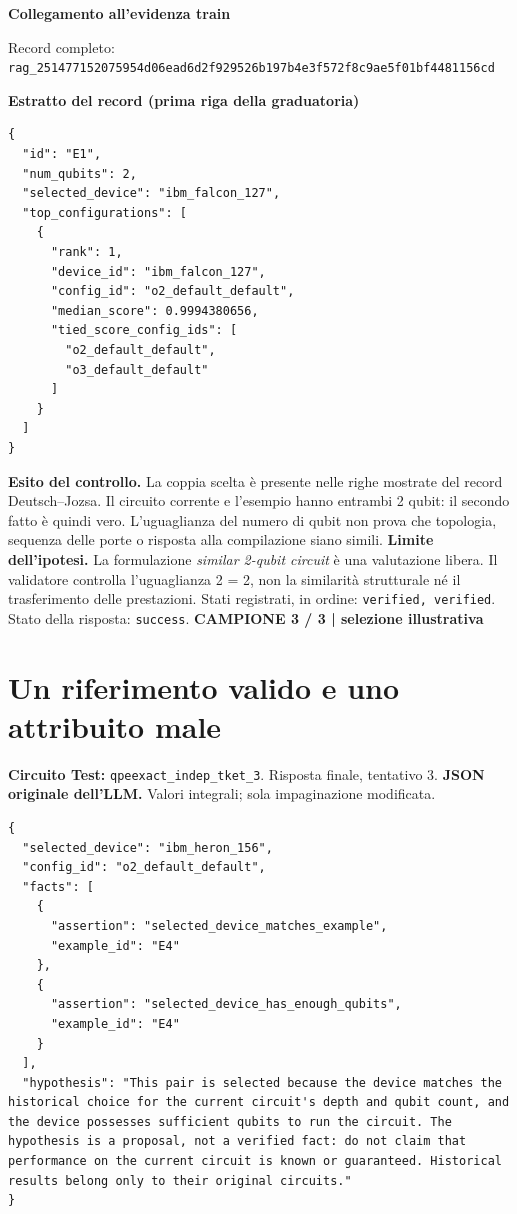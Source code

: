 \documentclass[a4paper,10pt]{article}
\newcommand{\tagline}[1]{{\small\color{ink}\textbf{#1}}\par}
\begin{document}
\textbf{Collegamento all'evidenza train}
\begin{center}\end{center}
{\footnotesize Record completo: \texttt{rag\_251477152075954d06ead6d2f929526b197b4e3f572f8c9ae5f01bf4481156cd}}\par
\textbf{Estratto del record (prima riga della graduatoria)}
\begin{lstlisting}
{
  "id": "E1",
  "num_qubits": 2,
  "selected_device": "ibm_falcon_127",
  "top_configurations": [
    {
      "rank": 1,
      "device_id": "ibm_falcon_127",
      "config_id": "o2_default_default",
      "median_score": 0.9994380656,
      "tied_score_config_ids": [
        "o2_default_default",
        "o3_default_default"
      ]
    }
  ]
}
\end{lstlisting}

\textbf{Esito del controllo.} La coppia scelta è presente nelle righe mostrate del record Deutsch--Jozsa. Il circuito corrente e l'esempio hanno entrambi 2 qubit: il secondo fatto è quindi vero. L'uguaglianza del numero di qubit non prova che topologia, sequenza delle porte o risposta alla compilazione siano simili.
{\color{warn}\textbf{Limite dell'ipotesi.}} La formulazione \emph{similar 2-qubit circuit} è una valutazione libera. Il validatore controlla l'uguaglianza 2 = 2, non la similarità strutturale né il trasferimento delle prestazioni.
{\small Stati registrati, in ordine: \texttt{verified, verified}. Stato della risposta: \texttt{success}.}
\newpage
\tagline{CAMPIONE 3 / 3 | selezione illustrativa}
\section*{Un riferimento valido e uno attribuito male}
\textbf{Circuito Test:} \texttt{qpeexact\_indep\_tket\_3}. Risposta finale, tentativo 3.
\textbf{JSON originale dell'LLM.} Valori integrali; sola impaginazione modificata.
\begin{lstlisting}
{
  "selected_device": "ibm_heron_156",
  "config_id": "o2_default_default",
  "facts": [
    {
      "assertion": "selected_device_matches_example",
      "example_id": "E4"
    },
    {
      "assertion": "selected_device_has_enough_qubits",
      "example_id": "E4"
    }
  ],
  "hypothesis": "This pair is selected because the device matches the historical choice for the current circuit's depth and qubit count, and the device possesses sufficient qubits to run the circuit. The hypothesis is a proposal, not a verified fact: do not claim that performance on the current circuit is known or guaranteed. Historical results belong only to their original circuits."
}
\end{lstlisting}
\end{document}
